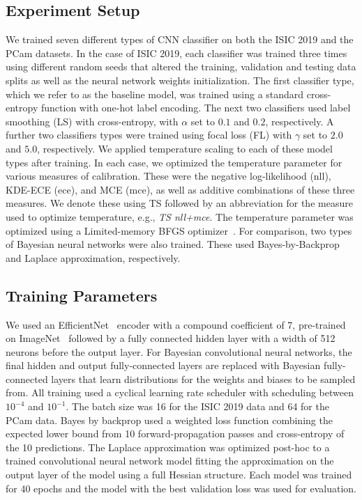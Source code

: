 \subsection{Experiment Setup}
We trained seven different types of CNN classifier on both the ISIC 2019 and the PCam datasets. In the case of ISIC 2019, each classifier was trained three times using different random seeds that altered the training, validation and testing data splits as well as the neural network weights initialization. The first classifier type, which we refer to as the baseline model, was trained using a standard cross-entropy function with one-hot label encoding. The next two classifiers used label smoothing (LS) with cross-entropy, with $\alpha$ set to $0.1$ and $0.2$, respectively. A further two classifiers types were trained using focal loss (FL) with $\gamma$ set to $2.0$ and $5.0$, respectively. We applied temperature scaling to each of these model types after training. In each case, we optimized the temperature parameter for various measures of calibration. These were the negative log-likelihood (nll), KDE-ECE (ece), and MCE (mce), as well as additive combinations of these three measures. We denote these using TS followed by an abbreviation for the measure used to optimize temperature, e.g., {\em TS nll+mce}. The temperature parameter was optimized using a Limited-memory BFGS optimizer~\citep{liu1989limited}. For comparison, two types of Bayesian neural networks were also trained. These used Bayes-by-Backprop and Laplace approximation, respectively.


\subsection{Training Parameters}
We used an EfficientNet~\citep{tan2019efficientnet} encoder with a compound coefficient of 7, pre-trained on ImageNet~\citep{deng2009imagenet} followed by a fully connected hidden layer with a width of 512 neurons before the output layer. For Bayesian convolutional neural networks, the final hidden and output fully-connected layers are replaced with Bayesian fully-connected layers that learn distributions for the weights and biases to be sampled from. All training used a cyclical learning rate scheduler with scheduling between $10^{-4}$ and $10^{-1}$. The batch size was 16 for the ISIC 2019 data and 64 for the PCam data. Bayes by backprop used a weighted loss function combining the expected lower bound from 10 forward-propagation passes and cross-entropy of the 10 predictions. The Laplace approximation was optimized post-hoc to a trained convolutional neural network model fitting the approximation on the output layer of the model using a full Hessian structure. Each model was trained for 40 epochs and the model with the best validation loss was used for evaluation.


